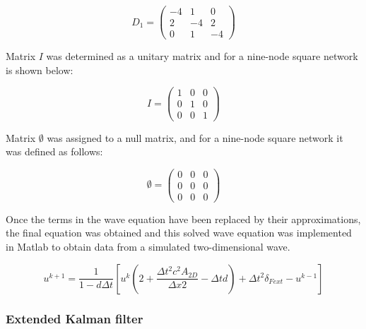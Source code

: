 \documentclass[12pt, a4paper]{article} %
\begin{document}
\begin{equation} \label{eqn:matrixD2}
    D_{1} = 
        \begin{pmatrix}
            -4 & 1 & 0\\
            2 & -4 & 2\\
            0 & 1 & -4
    \end{pmatrix}
\end{equation}

Matrix $I$ was determined as a unitary matrix and for a nine-node square network is shown below:

\begin{equation} \label{eqn:matrixI}
    I = 
        \begin{pmatrix}
            1 & 0 & 0\\
            0 & 1 & 0\\
            0 & 0 & 1
    \end{pmatrix}
\end{equation}

Matrix $\emptyset$ was assigned to a null matrix, and for a nine-node square network it was defined as follows:

\begin{equation} \label{eqn:matrixI}
    \emptyset = 
        \begin{pmatrix}
            0 & 0 & 0\\
            0 & 0 & 0\\
            0 & 0 & 0
    \end{pmatrix}
\end{equation}

Once the terms in the wave equation have been replaced by their approximations, the final equation was obtained and this solved wave equation was implemented in Matlab to obtain data from a simulated two-dimensional wave.

\begin{equation} \label{eqn:uk+1}
   u^{k + 1} = \frac{1}{1 - d\Delta t} \left[u^{k} \left(2+ \frac{\Delta t^{2} c^{2} A_{2D}}{\Delta x{2}} - \Delta t d\right) + \Delta t^{2} \delta_{Fext} - u^{k - 1}\right]
\end{equation}

\setlength{\parskip}{0mm}

\subsubsection{Extended Kalman filter}
\end{document}
